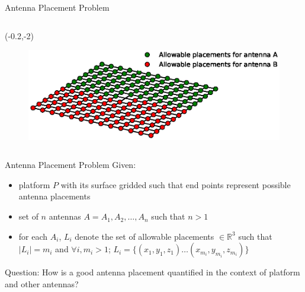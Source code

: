 \documentclass{beamer}
\begin{document}
\begin{frame}{Antenna Placement Problem}
\begin{columns}
{            \begin{textblock}{3}(-0.2,-2)
                \begin{figure}
                    \includegraphics[trim=170 165 70 145, clip, scale=0.4]{../paper/FIG/tc1_intro}
                \end{figure}\end{textblock}
        }
    \end{columns}
\end{frame}

\begin{frame}[t]{Antenna Placement Problem}
    Given:
\begin{itemize} \itemsep1.5em
        \item platform $P$ with its surface gridded such that end points represent possible antenna placements
        \item set of  $n$ antennas $A = {A_1, A_2, \dots, A_n}$ such that $n > 1$
        \item for each $A_i$, $L_i$ denote the set of allowable placements $\in \mathbb R^3$ such that $\mid L_i \mid = m_i$ and $\forall i, m_i > 1$; $L_i = \{(x_{1}, y_{1}, z_{1}) \dots (x_{m_i}, y_{m_i}, z_{m_i})\}$
    \end{itemize}
    \vspace{10px}
    \centering{}
\end{frame}

\begin{frame}{\null}
    \begin{tcolorbox}[colback=green!5]
        \centering
        Question: How is a good antenna placement quantified in the context of platform and other antennas?
    \end{tcolorbox}
\end{frame}
\end{document}
